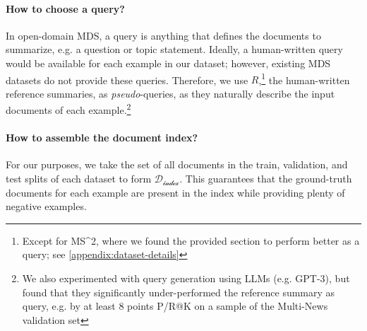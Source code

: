 \documentclass[11pt]{article}
\newcommand\mstoo{{MS\^{}2}\xspace}
\begin{document}
\paragraph{How to choose a query?} In open-domain MDS, a query is anything that defines the documents to summarize, e.g. a question or topic statement. Ideally, a human-written query would be available for each example in our dataset; however, existing MDS datasets do not provide these queries. Therefore, we use \(R\),\footnote{Except for \mstoo, where we found the provided  section to perform better as a query; see \autoref{appendix:dataset-details}} the human-written reference summaries, as \textit{pseudo}-queries, as they naturally describe the input documents of each example.\footnote{We also experimented with query generation using LLMs (e.g. GPT-3), but found that they significantly under-performed the reference summary as query, e.g. by at least 8 points P/R@K on a sample of the Multi-News validation set}

\paragraph{How to assemble the document index?} For our purposes, we take the set of all documents in the train, validation, and test splits of each dataset to form \(\mathcal{D_\text{index}}\). This guarantees that the ground-truth documents for each example are present in the index while providing plenty of negative examples.
\end{document}
